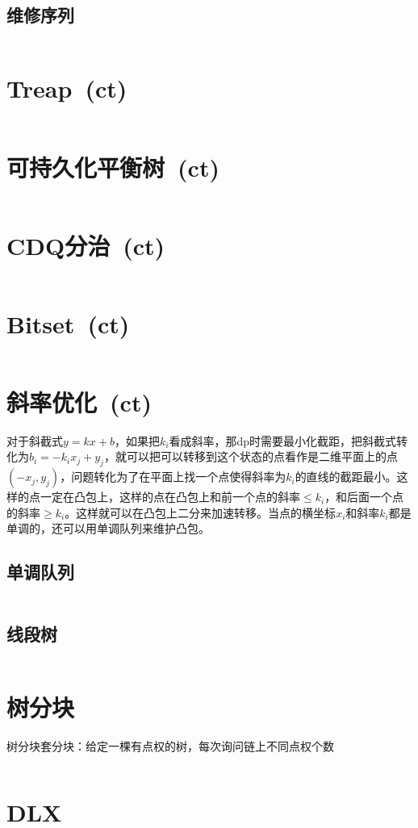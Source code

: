 	\subsection*{维修序列}
		\inputminted{cpp}{DataStructure/splay_arr.cpp}
\section{Treap\ \small(ct)}
	\inputminted{cpp}{DataStructure/treap.cpp}
\section{可持久化平衡树\ \small(ct)}
	\inputminted{cpp}{DataStructure/functional_treap.cpp}
\section{CDQ分治\ \small(ct)}
	\inputminted{cpp}{DataStructure/cdq_divide.cpp}
\section{Bitset\ \small(ct)}
	\inputminted{cpp}{DataStructure/bitset.cpp}
\section{斜率优化\ \small(ct)}
	对于斜截式$ y = k x + b $，如果把$ k_i $看成斜率，那dp时需要最小化截距，把斜截式转化为$ b_i = - k_i x_j + y_j $，就可以把可以转移到这个状态的点看作是二维平面上的点$ (- x_j, y_j) $，问题转化为了在平面上找一个点使得斜率为$ k_i $的直线的截距最小。这样的点一定在凸包上，这样的点在凸包上和前一个点的斜率$ \leq k_i$，和后面一个点的斜率$ \geq k_i $。这样就可以在凸包上二分来加速转移。当点的横坐标$ x_i $和斜率$ k_i $都是单调的，还可以用单调队列来维护凸包。
	\subsection*{单调队列}
		\inputminted{cpp}{DataStructure/slope_optimize_queue.cpp}
	\subsection*{线段树}
		\inputminted{cpp}{DataStructure/slope_optimize_segment.cpp}
\section{树分块}
	树分块套分块：给定一棵有点权的树，每次询问链上不同点权个数
	\inputminted{cpp}{DataStructure/tree_block.cpp}
\section{DLX}